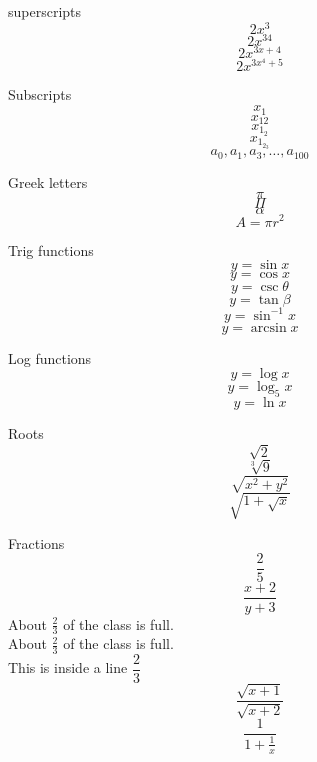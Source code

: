 \documentclass[12pt]{article}
\begin{document}
superscripts $$2x^3$$
$$2x^{34}$$
$$2x^{3x+4}$$
$$2x^{3x^4+5}$$

Subscripts 
$$x_1$$
$$x_{12}$$
$$x_{1_2}$$
$$x_{1_{2_3}}$$
$$a_0,a_1,a_3,\ldots,a_{100}$$

Greek letters
$$\pi$$
$$\Pi$$
$$\alpha$$
$$A=\pi r^2$$

Trig functions 
$$y=\sin x$$
$$y=\cos x$$
$$y=\csc \theta$$
$$y=\tan \beta$$
$$y=\sin^{-1}x$$
$$y=\arcsin x$$

Log functions 
$$y=\log x$$
$$y=\log_5 x$$
$$y=\ln x$$

Roots 
$$\sqrt{2}$$
$$\sqrt[3]{9}$$
$$\sqrt{x^2+y^2}$$
$$\sqrt{  1+\sqrt{x} }$$

Fractions
$$\frac{2}{5}$$
$$\frac{x+2}{y+3}$$
About $\displaystyle\frac{2}{3}$ of the class is full.\\[16pt]
About $\frac{2}{3}$ of the class is full.\\[6pt] 
This is inside a line $\dfrac{2}{3}$
$$\frac{\sqrt{x+1}}{\sqrt{x+2}}$$
$$\frac{1}{1+\frac{1}{x}}$$
\end{document}
